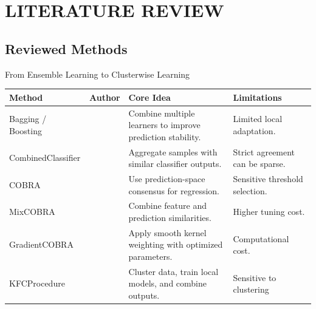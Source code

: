 \section{LITERATURE REVIEW}

\subsection{Reviewed Methods}

\begin{frame}[t]{From Ensemble Learning to Clusterwise Learning}
    \footnotesize
    \vspace{-0.12cm}
    \begin{table}
        \scriptsize
        \renewcommand{\arraystretch}{1.02}
        \setlength{\tabcolsep}{1.8pt}
        \begin{tabularx}{\textwidth}{
                >{\raggedright\arraybackslash}m{2.35cm}
                >{\raggedright\arraybackslash}m{2.65cm}
                >{\raggedright\arraybackslash}X
                >{\raggedright\arraybackslash}m{2.45cm}}
            \toprule
            \textbf{Method}    &
            \textbf{Author}    &
            \textbf{Core Idea} &
            \textbf{Limitations}                                                                                                                             \\
            \midrule
            Bagging / Boosting & \cite{breiman1996,freund1997} & Combine multiple learners to improve prediction stability. & Limited local adaptation.      \\
            CombinedClassifier & \cite{mojirsheibani200228}    & Aggregate samples with similar classifier outputs.         & Strict agreement can be
            sparse.                                                                                                                                          \\
            COBRA              & \cite{biau2016}               & Use prediction-space consensus for regression.             & Sensitive threshold selection. \\
            MixCOBRA           & \cite{fischer2019}            & Combine feature and prediction similarities.               & Higher tuning cost.            \\
            GradientCOBRA      & \cite{has2023gradientcobra}   & Apply smooth kernel weighting with optimized parameters.   & Computational cost.            \\
            KFCProcedure       & \cite{has2021kfc}             & Cluster data, train local models, and combine outputs.     & Sensitive to clustering

\end{tabularx}
\end{table}
\end{frame}
